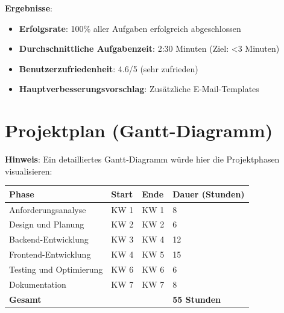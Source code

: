 \documentclass[11pt,a4paper]{article}
\begin{document}
\textbf{Ergebnisse}:
\begin{itemize}
    \item \textbf{Erfolgsrate}: 100\% aller Aufgaben erfolgreich abgeschlossen
    \item \textbf{Durchschnittliche Aufgabenzeit}: 2:30 Minuten (Ziel: <3 Minuten)
    \item \textbf{Benutzerzufriedenheit}: 4.6/5 (sehr zufrieden)
    \item \textbf{Hauptverbesserungsvorschlag}: Zusätzliche E-Mail-Templates
\end{itemize}

\section{Projektplan (Gantt-Diagramm)}
\textbf{Hinweis}: Ein detailliertes Gantt-Diagramm würde hier die Projektphasen visualisieren:

\begin{center}
\begin{tabular}{|l|l|l|l|}
\hline
\textbf{Phase} & \textbf{Start} & \textbf{Ende} & \textbf{Dauer (Stunden)} \\
\hline
Anforderungsanalyse & KW 1 & KW 1 & 8 \\
\hline
Design und Planung & KW 2 & KW 2 & 6 \\
\hline
Backend-Entwicklung & KW 3 & KW 4 & 12 \\
\hline
Frontend-Entwicklung & KW 4 & KW 5 & 15 \\
\hline
Testing und Optimierung & KW 6 & KW 6 & 6 \\
\hline
Dokumentation & KW 7 & KW 7 & 8 \\
\hline
\textbf{Gesamt} & & & \textbf{55 Stunden} \\
\hline
\end{tabular}
\end{center}
\end{document}
